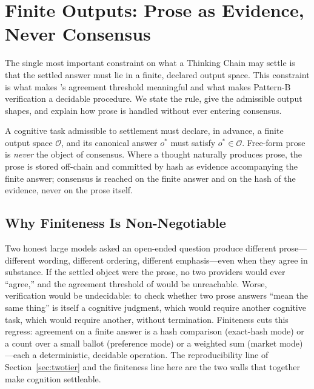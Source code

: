 \section{Finite Outputs: Prose as Evidence, Never Consensus}
\label{sec:finite}

The single most important constraint on what a Thinking Chain may settle is that the settled answer must lie in a finite, declared output space. This constraint is what makes \SCC{}'s agreement threshold meaningful and what makes Pattern-B verification a decidable procedure. We state the rule, give the admissible output shapes, and explain how prose is handled without ever entering consensus.

\begin{principle}
\label{prin:finite}
A cognitive task admissible to settlement must declare, in advance, a finite output space $\mathcal{O}$, and its canonical answer $o^\ast$ must satisfy $o^\ast \in \mathcal{O}$. Free-form prose is \emph{never} the object of consensus. Where a thought naturally produces prose, the prose is stored off-chain and committed by hash as evidence accompanying the finite answer; consensus is reached on the finite answer and on the hash of the evidence, never on the prose itself.
\end{principle}

\subsection{Why Finiteness Is Non-Negotiable}

Two honest large models asked an open-ended question produce different prose---different wording, different ordering, different emphasis---even when they agree in substance. If the settled object were the prose, no two providers would ever ``agree,'' and the agreement threshold of \SCC{} would be unreachable. Worse, verification would be undecidable: to check whether two prose answers ``mean the same thing'' is itself a cognitive judgment, which would require another cognitive task, which would require another, without termination. Finiteness cuts this regress: agreement on a finite answer is a hash comparison (exact-hash mode) or a count over a small ballot (preference mode) or a weighted sum (market mode)---each a deterministic, decidable operation. The reproducibility line of Section~\ref{sec:twotier} and the finiteness line here are the two walls that together make cognition settle\-able.

